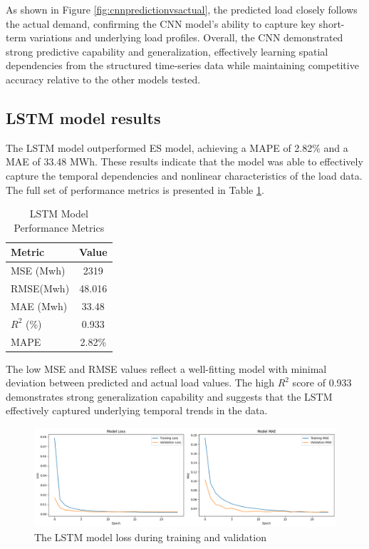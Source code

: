 As shown in Figure \ref{fig:cnnpredictionvsactual}, the predicted load closely follows the actual demand, confirming the CNN model’s ability to capture key short-term variations and underlying load profiles. Overall, the CNN demonstrated strong predictive capability and generalization, effectively learning spatial dependencies from the structured time-series data while maintaining competitive accuracy relative to the other models tested.

\subsection{LSTM model results}
The LSTM model outperformed ES model, achieving a MAPE of 2.82\% and a MAE of 33.48 MWh. These results indicate that the model was able to effectively capture the temporal dependencies and nonlinear characteristics of the load data. The full set of performance metrics is presented in Table \ref{tab:lstm_performance}.
\begin{table}[h!]
	\centering
	
	\begin{tabular}{lc}
		\hline
		\textbf{Metric} & \textbf{Value} \\
		\hline
		MSE (Mwh) & 2319 \\
		RMSE(Mwh)&48.016 \\
	MAE (Mwh)& 33.48 \\
	$R^2$ (\%)& 0.933 \\
	MAPE & 2.82\% \\
		\hline
	\end{tabular}
	\caption{LSTM Model Performance Metrics}
	\label{tab:lstm_performance}
\end{table}
The low MSE and RMSE values reflect a well-fitting model with minimal deviation between predicted and actual load values. The high $R^2$ score of 0.933 demonstrates strong generalization capability and suggests that the LSTM effectively captured underlying temporal trends in the data.
\begin{figure}[h!]
	\centering
	\includegraphics[width=0.9\linewidth]{"Chapters/images/results/lstm_model loss"}
	\caption{The LSTM model loss during training and validation}
	\label{fig:lstmmodel-loss}
\end{figure}
